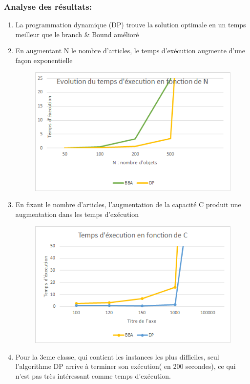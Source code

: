 \documentclass[12pt]{article}
\begin{document}
\subsubsection{Analyse des résultats:}
\begin{enumerate}
    \item La programmation dynamique (DP)  trouve la solution optimale en un temps meilleur que le branch \& Bound amélioré
    \item En augmentant N le nombre d’articles, le temps d'exécution augmente d’une façon exponentielle
    \begin{figure}[H]
        \includegraphics[width=13.5cm]{../figures/graph2.png}
    \end{figure}
    \item En fixant le nombre d’articles, l’augmentation de la capacité C produit une augmentation dans les temps d’exécution
    \begin{figure}[H]
        \includegraphics[width=13.5cm]{../figures/graph3.png}
    \end{figure}
    \item Pour la 3eme classe, qui contient les instances les plus difficiles, seul l’algorithme DP arrive à terminer son exécution( en 200 secondes), ce qui n’est pas très intéressant comme temps d'exécution.
\end{enumerate}
\end{document}
